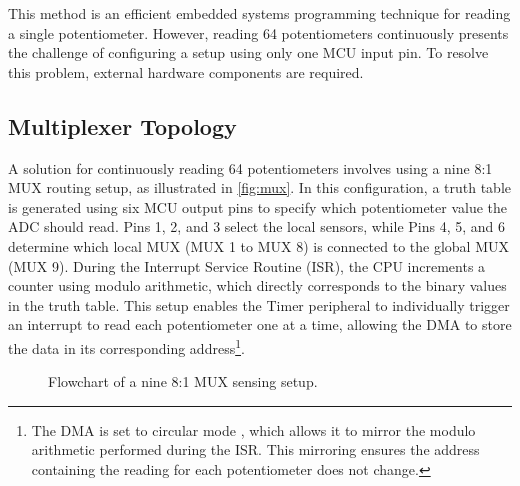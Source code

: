 \documentclass[12pt]{article}
\numberwithin{subsubsubsection}{subsubsection}
\begin{document}
This method is an efficient embedded systems programming technique for reading a single potentiometer. However, reading 64 potentiometers continuously presents the challenge of configuring a setup using only one MCU input pin. To resolve this problem, external hardware components are required.
\newpage

\subsection{Multiplexer Topology}

A solution for continuously reading 64 potentiometers involves using a nine 8:1 MUX routing setup, as illustrated in \autoref{fig:mux}. In this configuration, a truth table is generated using six MCU output pins to specify which potentiometer value the ADC should read. Pins 1, 2, and 3 select the local sensors, while Pins 4, 5, and 6 determine which local MUX (MUX 1 to MUX 8) is connected to the global MUX (MUX 9). During the Interrupt Service Routine (ISR), the CPU increments a counter using modulo arithmetic, which directly corresponds to the binary values in the truth table. This setup enables the Timer peripheral to individually trigger an interrupt to read each potentiometer one at a time, allowing the DMA to store the data in its corresponding address\footnote{The DMA is set to circular mode \cite{STM32_reference}, which allows it to mirror the modulo arithmetic performed during the ISR. This mirroring ensures the address containing the reading for each potentiometer does not change.}. 

\begin{figure}[H]
    \centering
    \caption{Flowchart of a nine 8:1 MUX sensing setup.}
    \label{fig:mux}
\end{figure}
\end{document}
